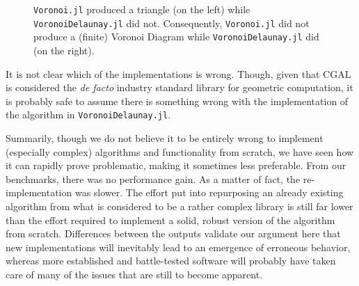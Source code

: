 \begin{figure}[htb]
  \resizebox{\linewidth}{!}{}
  \caption[Surprising Voronoi Delaunay output]{
    \texttt{Voronoi.jl} produced a triangle (on the left) while
    \texttt{VoronoiDelaunay.jl} did not.  Consequently, \texttt{Voronoi.jl} did
    not produce a (finite) Voronoi Diagram while \texttt{VoronoiDelaunay.jl} did
    (on the right).}%
  \label{fig:eval.voronoi.surprising}
\end{figure}

It is not clear which of the implementations is wrong.  Though, given that
\ac{CGAL} is considered the \textit{de facto} industry standard library for
geometric computation, it is probably safe to assume there is something wrong
with the implementation of the algorithm in \texttt{VoronoiDelaunay.jl}.

Summarily, though we do not believe it to be entirely wrong to implement
(especially complex) algorithms and functionality from scratch, we have seen how
it can rapidly prove problematic, making it sometimes less preferable.  From our
benchmarks, there was no performance gain.  As a matter of fact, the
re-implementation was slower.  The effort put into repurposing an already
existing algorithm from what is considered to be a rather complex library is
still far lower than the effort required to implement a solid, robust version of
the algorithm from scratch.  Differences between the outputs validate our
argument here that new implementations will inevitably lead to an emergence of
erroneous behavior, whereas more established and battle-tested software will
probably have taken care of many of the issues that are still to become
apparent.
